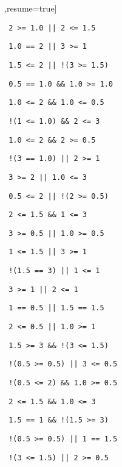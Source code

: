 \begin{exercise}
\begin{sltasks}[counter-format=2.tsk[1],resume=true]
\begin{items}
    \item \texttt{ 2 >= 1.0 || 2 <= 1.5 }
    \item \texttt{ 1.0 == 2 || 3 >= 1 }
    \item \texttt{ 1.5 <= 2 || !(3 >= 1.5) }
    \item \texttt{ 0.5 == 1.0 \&\& 1.0 >= 1.0 }
  \end{items}
  \task
  \begin{items}
    \item \texttt{ 1.0 <= 2 \&\& 1.0 <= 0.5 }
    \item \texttt{ !(1 <= 1.0) \&\& 2 <= 3 }
    \item \texttt{ 1.0 <= 2 \&\& 2 >= 0.5 }
    \item \texttt{ !(3 == 1.0) || 2 >= 1 }
    \item \texttt{ 3 >= 2 || 1.0 <= 3 }
  \end{items}
  \task
  \begin{items}
    \item \texttt{ 0.5 <= 2 || !(2 >= 0.5) }
    \item \texttt{ 2 <= 1.5 \&\& 1 <= 3 }
    \item \texttt{ 3 >= 0.5 || 1.0 >= 0.5 }
    \item \texttt{ 1 <= 1.5 || 3 >= 1 }
    \item \texttt{ !(1.5 == 3) || 1 <= 1 }
  \end{items}
  \task
  \begin{items}
    \item \texttt{ 3 >= 1 || 2 <= 1 }
    \item \texttt{ 1 == 0.5 || 1.5 == 1.5 }
    \item \texttt{ 2 <= 0.5 || 1.0 >= 1 }
    \item \texttt{ 1.5 >= 3 \&\& !(3 <= 1.5) }
    \item \texttt{ !(0.5 >= 0.5) || 3 <= 0.5 }
  \end{items}
  \task
  \begin{items}
    \item \texttt{ !(0.5 <= 2) \&\& 1.0 >= 0.5 }
    \item \texttt{ 2 <= 1.5 \&\& 1.0 <= 3 }
    \item \texttt{ 1.5 == 1 \&\& !(1.5 >= 3) }
    \item \texttt{ !(0.5 >= 0.5) || 1 == 1.5 }
    \item \texttt{ !(3 <= 1.5) || 2 >= 0.5 }
  \end{items}
  \task
  \begin{items}

\end{items}
\end{sltasks}
\end{exercise}
